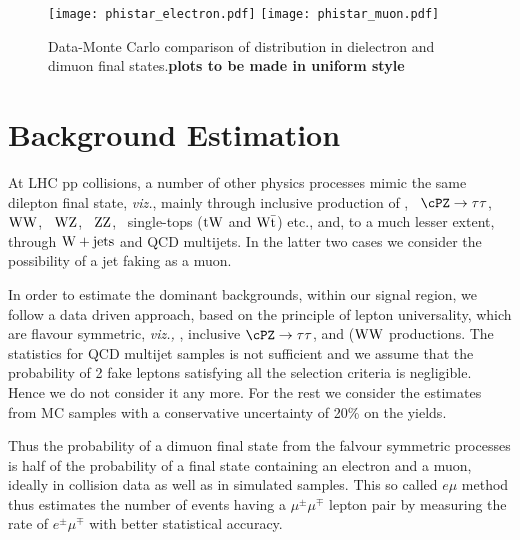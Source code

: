 \begin{figure}[hbtp]
\begin{center}
\texttt{[image: phistar\_electron.pdf]}
\texttt{[image: phistar\_muon.pdf]}
\caption{Data-Monte Carlo comparison of  \phistar distribution in dielectron and dimuon final states.{\bf plots to be made in uniform style}}
    \label{fig:Nphistar}
\end{center}
\end{figure}

\section{Background Estimation}
\label{sec:bkgnd}
At LHC pp collisions, a number of other physics 
processes mimic the same dilepton final state, {\it viz.}, mainly through 
inclusive production of
\ttbar, ~$ \cPZ\to \tau\tau$, ~${\rm  WW}$, ~${\rm  WZ}$, 
~${\rm   ZZ}$,  ~single-tops (${\rm tW}$  and ${\rm W\bar t}$)  etc.,
 and, to a much lesser extent, through  ${\rm W +jets}$ and QCD multijets. 
In the latter two cases we consider the possibility of a jet faking as a muon.

In order to estimate the dominant backgrounds, within our signal region, we
follow a data driven approach, based on the principle of lepton universality,
which are  flavour symmetric, {\it viz.,} \ttbar, inclusive $\cPZ\to \tau\tau$, and (${\rm  WW}$ productions. The statistics for QCD multijet samples is not
sufficient and we assume that the probability of 2 fake leptons satisfying all the selection criteria is negligible. Hence we do not consider it any more. 
For the rest we consider the estimates
from MC samples with a conservative uncertainty of 20\%  on the yields. 

 Thus the probability of a dimuon final
state from the falvour symmetric processes is half of the probability
of a final state containing an electron and a muon, ideally in collision 
data as well as in simulated samples. This so
called $e\mu$ method thus estimates the number of events having a
$\mu$$^{\pm}$$\mu^{\mp}$ lepton pair by measuring the rate of $e^{\pm}$$\mu^{\mp}$
with better statistical accuracy.

